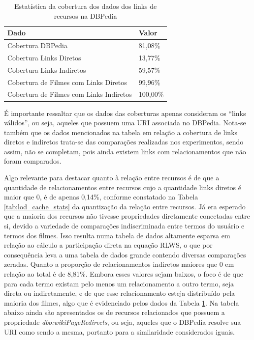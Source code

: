 \begin{table}[H]
\centering
\begin{tabular}{|l|l|}
\hline
\textbf{Dado}                           & \textbf{Valor} \\ \hline
Cobertura DBPedia                       & 81,08\%        \\ \hline
Cobertura Links Diretos                 & 13,77\%        \\ \hline
Cobertura Links Indiretos               & 59,57\%        \\ \hline
Cobertura de Filmes com Links Diretos   & 99,96\%        \\ \hline
Cobertura de Filmes com Links Indiretos & 100,00\%       \\ \hline
\end{tabular}
\caption{Estatística da cobertura dos dados dos links de recursos na DBPedia}
\label{tab:lod_statistics}
\end{table}

É importante ressaltar que os dados das coberturas apenas consideram os \enquote{links válidos}, ou seja, aqueles que possuem uma URI associada no DBPedia. Nota-se também que os dados mencionados na tabela em relação a cobertura de links diretos e indiretos trata-se das comparações realizadas nos experimentos, sendo assim, não se completam, pois ainda existem links com relacionamentos que não foram comparados.

Algo relevante para destacar quanto à relação entre recursos é de que a quantidade de relacionamentos entre recursos cujo a quantidade links diretos é maior que 0, é de apenas 0,14\%, conforme constatado na Tabela  \ref{tab:lod_cache_stats} da quantização da relação entre recursos. Já era esperado que a maioria dos recursos não tivesse propriedades diretamente conectadas entre si, devido a variedade de comparações indiscriminada entre termos do usuário e termos dos filmes. Isso resulta numa tabela de dados altamente esparsa em relação ao cálculo a participação direta na equação \ac{RLWS}, o que por consequência leva a uma tabela de dados grande contendo diversas comparações zeradas. Quanto a proporção de relacionamentos indiretos maiores que 0 em relação ao total é de 8,81\%. Embora esses valores sejam baixos, o foco é de que para cada termo existam pelo menos um relacionamento a outro termo, seja direta ou indiretamente, e de que esse relacionamento esteja distribuído pela maioria dos filmes, algo que é evidenciado pelos dados da Tabela \ref{tab:lod_statistics}. Na tabela abaixo ainda são apresentados os de recursos relacionados que possuem a propriedade \textit{dbo:wikiPageRedirects}, ou seja, aqueles que o DBPedia resolve sua \ac{URI} como sendo a mesma, portanto para a similaridade considerados iguais.

